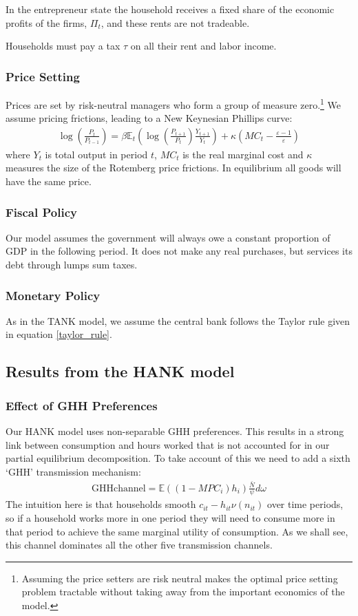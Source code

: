 \documentclass[titlepage]{\econtex}\newcommand{\texname}{ConsumptionHeterogeneity}
\begin{document}
In the entrepreneur state the household receives a fixed share of the economic profits of the firms, $\Pi_t$, and these rents are not tradeable.

Households must pay a tax $\tau$ on all their rent and labor income.

\subsubsection{Price Setting}
Prices are set by risk-neutral managers who form a group of measure zero.\footnote{Assuming the price setters are risk neutral makes the optimal price setting problem tractable without taking away from the important economics of the model.} We assume \cite{rotemberg_sticky_1982} pricing frictions, leading to a New Keynesian Phillips curve:
\begin{align*}
\log\left(\frac{P_t}{P_{t-1}}\right) = \beta \mathbb{E}_t \left( \log \left(\frac{P_{t+1}}{P_{t}}\right) \frac{Y_{t+1}}{Y_{t}} \right) + \kappa \left( MC_t - \frac{\varepsilon-1}{\varepsilon} \right)
\end{align*}
where $Y_t$ is total output in period $t$, $MC_t$ is the real marginal cost and $\kappa$ measures the size of the Rotemberg price frictions. In equilibrium all goods will have the same price.

\subsubsection{Fiscal Policy}
Our model assumes the government will always owe a constant proportion of GDP in the following period. It does not make any real purchases, but services its debt through lumps sum taxes.


\subsubsection{Monetary Policy}
As in the TANK model, we assume the central bank follows the Taylor rule given in equation \ref{taylor_rule}.

\subsection{Results from the HANK model}
\subsubsection{Effect of GHH Preferences}
Our HANK model uses non-separable GHH preferences. This results in a strong link between consumption and hours worked that is not accounted for in our partial equilibrium decomposition. To take account of this we need to add a sixth `GHH' transmission mechanism:
\begin{align*}
\text{GHHchannel} = \mathbb{E}\left((1-MPC_i) h_i\right)  \frac{\bar{N}}{\psi} d\omega
\end{align*}
The intuition here is that households smooth $c_{it} - h_{it}\nu(n_{it})$ over time periods, so if a household works more in one period they will need to consume more in that period to achieve the same marginal utility of consumption. As we shall see, this channel dominates all the other five transmission channels.
\end{document}
